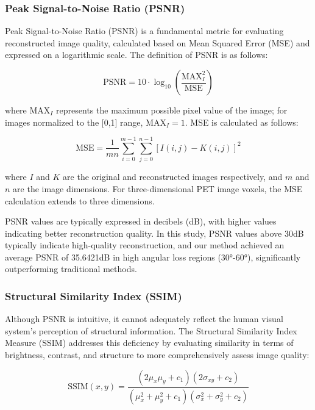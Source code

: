 \documentclass[
reprint,
superscriptaddress,
nofootinbib,
amsmath,amssymb,
aps,
prd,
]{revtex4-2}
\begin{document}
\subsubsection{Peak Signal-to-Noise Ratio (PSNR)}

Peak Signal-to-Noise Ratio (PSNR) is a fundamental metric for evaluating reconstructed image quality, calculated based on Mean Squared Error (MSE) and expressed on a logarithmic scale. The definition of PSNR is as follows:

\begin{equation}
\text{PSNR} = 10 \cdot \log_{10}\left(\frac{\text{MAX}_I^2}{\text{MSE}}\right)
\end{equation}

where $\text{MAX}_I$ represents the maximum possible pixel value of the image; for images normalized to the [0,1] range, $\text{MAX}_I = 1$. MSE is calculated as follows:

\begin{equation}
\text{MSE} = \frac{1}{mn}\sum_{i=0}^{m-1}\sum_{j=0}^{n-1}[I(i,j) - K(i,j)]^2
\end{equation}

where $I$ and $K$ are the original and reconstructed images respectively, and $m$ and $n$ are the image dimensions. For three-dimensional PET image voxels, the MSE calculation extends to three dimensions.

PSNR values are typically expressed in decibels (dB), with higher values indicating better reconstruction quality. In this study, PSNR values above 30dB typically indicate high-quality reconstruction, and our method achieved an average PSNR of 35.6421dB in high angular loss regions (30°-60°), significantly outperforming traditional methods.

\subsubsection{Structural Similarity Index (SSIM)}

Although PSNR is intuitive, it cannot adequately reflect the human visual system's perception of structural information. The Structural Similarity Index Measure (SSIM) addresses this deficiency by evaluating similarity in terms of brightness, contrast, and structure to more comprehensively assess image quality:

\begin{equation}
\text{SSIM}(x, y) = \frac{(2\mu_x\mu_y + c_1)(2\sigma_{xy} + c_2)}{(\mu_x^2 + \mu_y^2 + c_1)(\sigma_x^2 + \sigma_y^2 + c_2)}
\end{equation}
\end{document}
